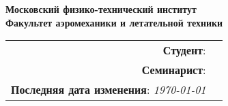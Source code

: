 \begin{titlepage}
	\clearpage\thispagestyle{empty}
	\centering
	
	\textbf{Московский физико-технический институт \\ Факультет аэромеханики и летательной техники }
	\vspace{55ex}

	\begin{center}
		\LARGE \textsc{\HometaskName}
	\end{center}
	\vfill
	
	\begin{flushright}
		\begin{tabular}{rr}
			\textbf{Студент}: \textit{\StudentName}\\
			\textbf{Семинарист}: \textit{\SeminarianName}\\
			\textbf{Последняя дата изменения}: \textit{\today}\\
		\end{tabular}
	\end{flushright}
	\pagebreak
\end{titlepage}